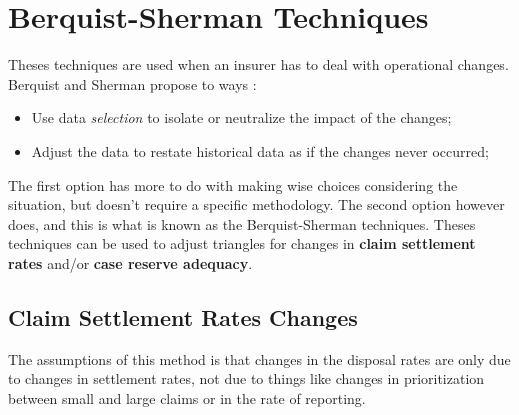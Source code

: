 \documentclass[11pt, english]{memoir}
\numberwithin{definition}{section}
\begin{document}
	
	
\chapter{Berquist-Sherman Techniques}

Theses techniques are used when an insurer has to deal with operational changes. Berquist and Sherman propose to ways : 
\begin{itemize}
	\item Use data \emph{selection} to isolate or neutralize the impact of the changes;
	\item Adjust the data to restate historical data as if the changes never occurred; 
\end{itemize}
	
The first option has more to do with making wise choices considering the situation, but doesn't require a specific methodology. The second option however does, and this is what is known as the Berquist-Sherman techniques. Theses techniques can be used to adjust triangles for changes in \textbf{claim settlement rates} and/or \textbf{case reserve adequacy}.

\section{Claim Settlement Rates Changes}
	 
	The assumptions of this method is that changes in the disposal rates are only due to changes in settlement rates, not due to things like changes in prioritization between small and large claims or in the rate of reporting. 
	
\end{document}
